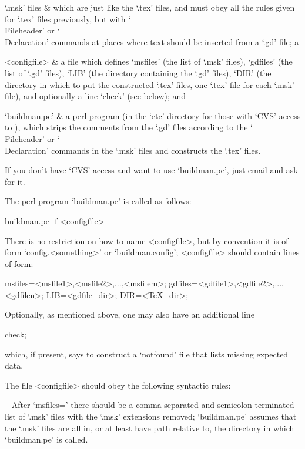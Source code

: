 `.msk' files &
which are just like the `.tex' files, and must obey all the  rules  given
for `.tex' files previously, but with `\\Fileheader'  or  `\\Declaration'
commands at places where text should be inserted from a `.gd' file; a

<configfile> &
a file which defines `msfiles' (the list of `.msk' files), `gdfiles' (the
list of `.gd' files), `LIB' (the directory containing the  `.gd'  files),
`DIR' (the directory in which to put the constructed  `.tex'  files,  one
`.tex' file for each `.msk' file), and optionally  a  line  `check'  (see
below); and

`buildman.pe' &
a perl program (in the `etc' directory for those  with  `CVS'  access  to
{\GAP}), which strips the comments from the `.gd' files according to  the
`\\Fileheader' or  `\\Declaration'  commands  in  the  `.msk'  files  and
constructs the `.tex' files.

\enditems

If you don't have `CVS' access and want to use `buildman.pe',  just  email
 and ask for it.

The perl program `buildman.pe' is called as follows:

buildman.pe -f <configfile>

There is no restriction on how to name <configfile>, but by convention it
is of form `config.<something>' or `buildman.config'; <configfile> should
contain lines of form:

msfiles=<msfile1>,<msfile2>,...,<msfilem>;
gdfiles=<gdfile1>,<gdfile2>,...,<gdfilen>;
LIB=<gdfile_dir>;
DIR=<TeX_dir>;

Optionally, as mentioned above, one may also have an additional line

check;

which, if present, says to construct a `notfound' file that lists missing
expected data.

The file <configfile> should obey the following syntactic rules:

\beginlist

\item{--}
After   `msfiles='   there    should    be    a    comma-separated    and
semicolon-terminated list of `.msk'  files  with  the  `.msk'  extensions
removed; `buildman.pe' assumes that the `.msk' files are all  in,  or  at
least have path relative to, the  directory  in  which  `buildman.pe'  is
called.


